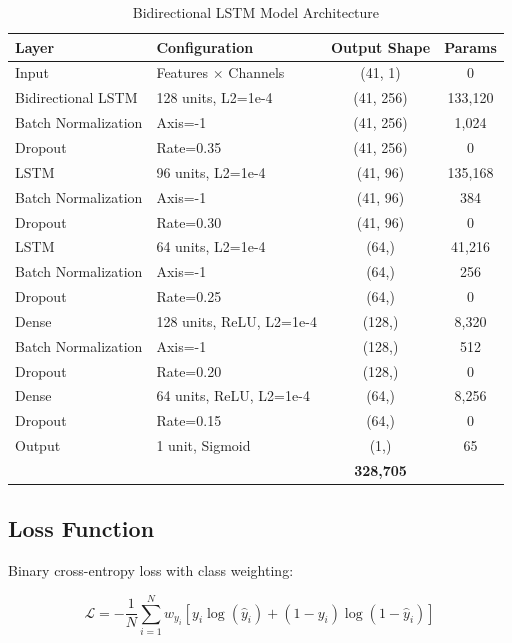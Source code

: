 \documentclass[12pt,a4paper]{report}
\begin{document}
\begin{table}[H]
\centering
\caption{Bidirectional LSTM Model Architecture}
\label{tab:architecture}
\begin{tabular}{>{\raggedright\arraybackslash}p{2.8cm}p{3.5cm}cc}
\toprule
\textbf{Layer} & \textbf{Configuration} & \textbf{Output Shape} & \textbf{Params} \\
\midrule
Input & Features $\times$ Channels & (41, 1) & 0 \\
Bidirectional LSTM & 128 units, L2=1e-4 & (41, 256) & 133,120 \\
Batch Normalization & Axis=-1 & (41, 256) & 1,024 \\
Dropout & Rate=0.35 & (41, 256) & 0 \\
LSTM & 96 units, L2=1e-4 & (41, 96) & 135,168 \\
Batch Normalization & Axis=-1 & (41, 96) & 384 \\
Dropout & Rate=0.30 & (41, 96) & 0 \\
LSTM & 64 units, L2=1e-4 & (64,) & 41,216 \\
Batch Normalization & Axis=-1 & (64,) & 256 \\
Dropout & Rate=0.25 & (64,) & 0 \\
Dense & 128 units, ReLU, L2=1e-4 & (128,) & 8,320 \\
Batch Normalization & Axis=-1 & (128,) & 512 \\
Dropout & Rate=0.20 & (128,) & 0 \\
Dense & 64 units, ReLU, L2=1e-4 & (64,) & 8,256 \\
Dropout & Rate=0.15 & (64,) & 0 \\
Output & 1 unit, Sigmoid & (1,) & 65 \\
\midrule
\multicolumn{2}{l}{\textbf{Total Parameters}} & & \textbf{328,705} \\
\bottomrule
\end{tabular}
\end{table}

\subsection{Loss Function}

Binary cross-entropy loss with class weighting:

\begin{equation}
    \mathcal{L} = -\frac{1}{N} \sum_{i=1}^{N} w_{y_i} \left[ y_i \log(\hat{y}_i) + (1-y_i) \log(1-\hat{y}_i) \right]
\end{equation}
\end{document}

